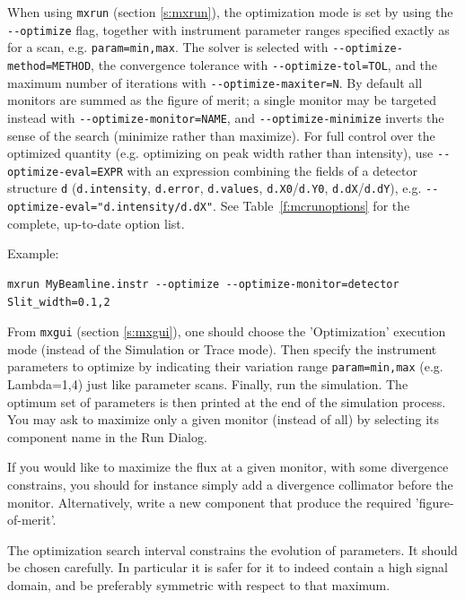 When using \verb+mxrun+ (section \ref{s:mxrun}), the optimization mode is set by
using the \verb+--optimize+ flag, together with instrument parameter ranges
specified exactly as for a scan, e.g. \verb+param=min,max+. The solver is
selected with \verb+--optimize-method=METHOD+, the convergence tolerance with
\verb+--optimize-tol=TOL+, and the maximum number of iterations with
\verb+--optimize-maxiter=N+. By default all monitors are summed as the
figure of merit; a single monitor may be targeted instead with
\verb+--optimize-monitor=NAME+, and \verb+--optimize-minimize+ inverts the
sense of the search (minimize rather than maximize). For full control over
the optimized quantity (e.g. optimizing on peak width rather than
intensity), use \verb+--optimize-eval=EXPR+ with an expression combining
the fields of a detector structure \texttt{d} (\texttt{d.intensity},
\texttt{d.error}, \texttt{d.values}, \texttt{d.X0}/\texttt{d.Y0},
\texttt{d.dX}/\texttt{d.dY}), e.g.
\verb+--optimize-eval="d.intensity/d.dX"+. See Table~\ref{f:mcrunoptions}
for the complete, up-to-date option list.

Example:
\begin{lstlisting}
mxrun MyBeamline.instr --optimize --optimize-monitor=detector Slit_width=0.1,2
\end{lstlisting}

From \verb+mxgui+ (section \ref{s:mxgui}), one should choose the 'Optimization'
execution mode (instead of the Simulation or Trace mode). Then specify the
instrument parameters to optimize by indicating their variation range
\verb+param=min,max+ (e.g. Lambda=1,4) just like parameter scans. Finally, run
the simulation. The optimum set of parameters is then printed at the end of
the simulation process. You may ask to maximize only a given monitor (instead
of all) by selecting its component name in the Run Dialog.

If you would like to maximize the flux at a given monitor, with some
divergence constrains, you should for instance simply add a divergence
collimator before the monitor. Alternatively, write a new component
that produce the required 'figure-of-merit'.

The optimization search interval constrains the evolution of
parameters. It should be chosen carefully. In particular it is safer
for it to indeed contain a high signal domain, and be preferably
symmetric with respect to that maximum.

